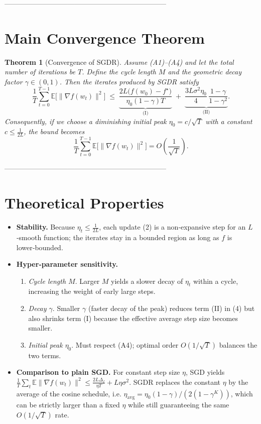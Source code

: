 \documentclass{article}
\newtheorem{theorem}{Theorem}
\newcommand{\E}{\mathbb{E}}
\begin{document}
---------------------------------------------------------------------

\section*{Main Convergence Theorem}
\begin{theorem}[Convergence of SGDR]
\label{thm:sgdr}
Assume (A1)–(A4) and let the total number of iterations be $T$.
Define the cycle length $M$ and the geometric decay factor $\gamma\in(0,1)$.
Then the iterates produced by SGDR satisfy
\[
\frac{1}{T}\sum_{t=0}^{T-1}\E\!\bigl[\|\nabla f(w_t)\|^{2}\bigr]
\;\le\;
\underbrace{\frac{2L\bigl(f(w_0)-f^{\star}\bigr)}{\eta_0(1-\gamma)T}}_{ \displaystyle \text{(I)}}
\;+\;
\underbrace{\frac{3L\sigma^{2}\eta_0}{4}\,
\frac{1-\gamma}{1-\gamma^{2}}}_{ \displaystyle \text{(II)} } .
\tag{4}
\]
Consequently, if we choose a diminishing initial peak
$\eta_0=c/\sqrt{T}$ with a constant $c\le\frac{1}{2L}$,
the bound becomes
\[
\frac{1}{T}\sum_{t=0}^{T-1}\E\!\bigl[\|\nabla f(w_t)\|^{2}\bigr]
=O\!\left(\frac{1}{\sqrt{T}}\right).
\]
\end{theorem}

---------------------------------------------------------------------

\section*{Theoretical Properties}
\begin{itemize}
\item \textbf{Stability.} Because $\eta_t\le\frac{1}{2L}$, each update (2) is a
non‑expansive step for an $L$‑smooth function; the iterates stay in a bounded
region as long as $f$ is lower‑bounded.
\item \textbf{Hyper‑parameter sensitivity.}
    \begin{enumerate}
        \item \emph{Cycle length $M$}. Larger $M$ yields a slower decay of
        $\eta_t$ within a cycle, increasing the weight of early large steps.
        \item \emph{Decay $\gamma$}. Smaller $\gamma$ (faster decay of the peak)
        reduces term (II) in (4) but also shrinks term (I) because the effective
        average step size becomes smaller.
        \item \emph{Initial peak $\eta_0$}. Must respect (A4); optimal order
        $O(1/\sqrt{T})$ balances the two terms.
    \end{enumerate}
\item \textbf{Comparison to plain SGD.}
    For constant step size $\eta$, SGD yields
    $\frac{1}{T}\sum_{t}\E\|\nabla f(w_t)\|^{2}
    \le\frac{2L\Delta_f}{\eta T}+L\eta\sigma^{2}$.
    SGDR replaces the constant $\eta$ by the average of the cosine schedule,
    i.e. $\eta_{\text{avg}}=\eta_0(1-\gamma)/(2(1-\gamma^{K}))$, which can be
    strictly larger than a fixed $\eta$ while still guaranteeing the same
    $O(1/\sqrt{T})$ rate.
\end{itemize}
\end{document}
